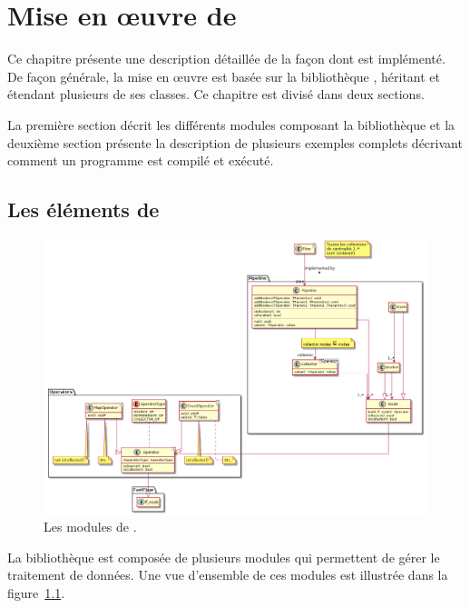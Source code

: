 
\chapter{Mise en \oe{}uvre de \PpFf}
\label{implementation.chap}


Ce chapitre pr\'esente une description d\'etaill\'ee de la fa\c{c}on dont  est impl\'ement\'e. 
%
De fa\c{c}on g\'en\'erale, la mise en \oe{}uvre est bas\'ee sur la biblioth\`eque , h\'eritant et \'etendant plusieurs de ses classes. Ce chapitre est divis\'e dans deux sections.

La premi\`ere section d\'ecrit les diff\'erents modules composant la biblioth\`eque  et la deuxi\`eme section pr\'esente la description de plusieurs exemples complets d\'ecrivant comment un programme \PpFf{} est compil\'e et ex\'ecut\'e.


\section{Les \'el\'ements de }

\begin{figure}
\centering
     \includegraphics[width=1.0\textwidth]{Figures/all.png}
      \caption{Les modules de .}
       \label{All.fig}
\end{figure}

La biblioth\`eque  est compos\'ee de plusieurs modules qui permettent de g\'erer le traitement de donn\'ees. Une vue d'ensemble de ces modules est illustr\'ee dans la figure~\ref{All.fig}.

